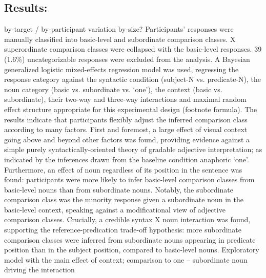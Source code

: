 \subsection{Results:}
by-target / by-participant variation
by-size?
Participants’ responses were manually classified into basic-level and subordinate comparison classes. X superordinate comparison classes were collapsed with the basic-level responses. 39 (1.6\%) uncategorizable responses were excluded from the analysis. 
A Bayesian generalized logistic mixed-effects regression model was used, regressing the response category against the syntactic condition (subject-N vs. predicate-N), the noun category (basic vs. subordinate vs. ‘one’), the context (basic vs. subordinate), their two-way and three-way interactions and maximal random effect structure appropriate for this experimental design (footnote formula). 
The results indicate that participants flexibly adjust the inferred comparison class according to many factors. First and foremost, a large effect of visual context going above and beyond other factors was found, providing evidence against a simple purely syntactically-oriented theory of gradable adjective interpretation; as indicated by the inferences drawn from the baseline condition anaphoric ‘one’. Furthermore, an effect of noun regardless of its position in the sentence was found: participants were more likely to infer basic-level comparison classes from basic-level nouns than from subordinate nouns. Notably, the subordinate comparison class was the minority response given a subordinate noun in the basic-level context, speaking against a modificational view of adjective comparison classes. Crucially, a credible syntax X noun interaction was found, supporting the reference-predication trade-off hypothesis: more subordinate comparison classes were inferred from subordinate nouns appearing in predicate position than in the subject position, compared to basic-level nouns. 
Exploratory model with the main effect of context; comparison to one -- subordinate noun driving the interaction

